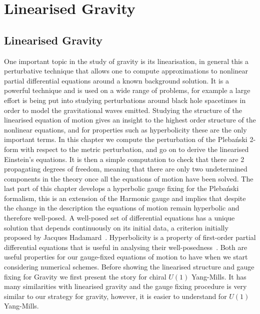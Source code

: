 \documentclass[10pt]{report}
\newcommand{\pleb}[0]{Pleba\'nski}
\theoremstyle{definition}
\begin{document}
    \newpage
    \part{Linearised Gravity}\label{part:linearised-gravity}

    \newpage
\chapter{Linearised Gravity}\label{chap:Linearised-Gravity}
One important topic in the study of gravity is its linearisation, in general this a perturbative technique that allows one to compute approximations to nonlinear partial differential equations around a known background solution. It is a powerful technique and is used on a wide range of problems, for example a large effort is being put into studying perturbations around black hole spacetimes in order to model the gravitational waves emitted. Studying the structure of the linearised equation of motion gives an insight to the highest order structure of the nonlinear equations, and for properties such as hyperbolicity these are the only important terms. In this chapter we compute the perturbation of the \pleb{} 2-form with respect to the metric perturbation, and go on to derive the linearised Einstein's equations. It is then a simple computation to check that there are 2 propagating degrees of freedom, meaning that there are only two undetermined components in the theory once all the equations of motion have been solved. The last part of this chapter develops a hyperbolic gauge fixing for the \pleb{} formalism, this is an extension of the Harmonic gauge and implies that despite the change in the description the equations of motion remain hyperbolic and therefore well-posed. A well-posed set of differential equations has a unique solution that depends continuously on its initial data, a criterion initially proposed by Jacques Hadamard~\cite{SurLesProblemsHadamard1920}. Hyperbolicity is a property of first-order partial differential equations that is useful in analysing their well-posedness~\cite{Time_Dependent_Gustaf_2013}. Both are useful properties for our gauge-fixed equations of motion to have when we start considering numerical schemes. Before showing the linearised structure and gauge fixing for Gravity we first present the story for chiral $U(1)$ Yang-Mills. It has many similarities with linearised gravity and the gauge fixing procedure is very similar to our strategy for gravity, however, it is easier to understand for $U(1)$ Yang-Mills.
\end{document}
